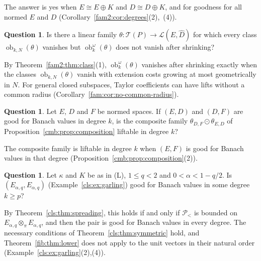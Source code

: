 \documentclass[11pt]{amsart}
\theoremstyle{definition}
\theoremstyle{remark}
\numberwithin{equation}{section}
\newcommand{\cL}{\mathcal L}
\theoremstyle{plain}
\theoremstyle{definition}
\newtheorem{question}[theorem]{Question}
\theoremstyle{plain}
\newcommand{\ob}{\operatorname{ob}}
\newcommand{\cP}{\mathcal P}
\begin{document}
The answer is yes when $E\cong E\oplus K$ and $D\cong D\oplus K$, and for goodness for all normed $E$ and $D$
(Corollary~\ref{fam2:cor:degrees}(2),~(4)).

\begin{question}\label{q:quest:non-uniform}
Is there a linear family $\theta\colon\mathcal T(P)\to\cL(E,\widehat D)$ for which every class $\ob_{k,N}(\theta)$ vanishes
but $\ob^\omega_k(\theta)$ does not vanish after shrinking?
\end{question}

By Theorem~\ref{fam2:thm:class}(1), $\ob^\omega_k(\theta)$ vanishes after shrinking exactly when the classes
$\ob_{k,N}(\theta)$ vanish with extension costs growing at most geometrically in $N$. For general closed subspaces, Taylor
coefficients can have lifts without a common radius (Corollary~\ref{fam:cor:no-common-radius}).

\begin{question}\label{q:quest:composite}
Let $E$, $D$ and $F$ be normed spaces. If $(E,D)$ and $(D,F)$ are good for Banach values in degree $k$, is the
composite family $\theta_{D,F}\odot\theta_{E,D}$ of Proposition~\ref{cmb:prop:composition} liftable in degree $k$?
\end{question}

The composite family is liftable in degree $k$ when $(E,F)$ is good for Banach values in that degree
(Proposition~\ref{cmb:prop:composition}(2)).

\begin{question}\label{q:quest:garling}
Let $\kappa$ and $K$ be as in \textup{(L)}, $1\le q<2$ and $0<\alpha<1-q/2$. Is $(E_{\alpha,q},E_{\alpha,q})$
(Example~\ref{cls:ex:garling}) good for Banach values in some degree $k\ge p$?
\end{question}

By Theorem~\ref{cls:thm:spreading}, this holds if and only if $\cP_<$ is bounded on $E_{\alpha,q}\otimes_\pi E_{\alpha,q}$,
and then the pair is good for Banach values in every degree. The necessary conditions of Theorem~\ref{cls:thm:symmetric}
hold, and Theorem~\ref{fib:thm:lower} does not apply to the unit vectors in their natural order
(Example~\ref{cls:ex:garling}(2),(4)).
\end{document}
